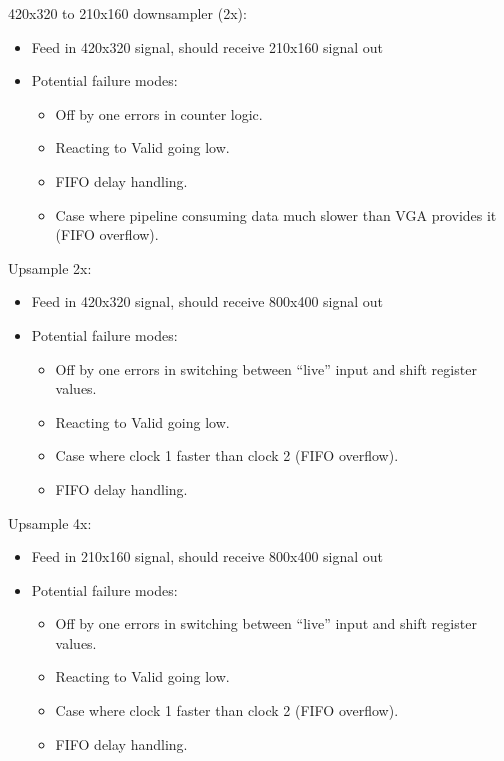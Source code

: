 \documentclass[11pt]{article}
\begin{document}
\noindent 420x320 to 210x160 downsampler (2x):
\begin{itemize}
    \item Feed in 420x320 signal, should receive 210x160 signal out
    \item Potential failure modes:
        \begin{itemize}
            \item Off by one errors in counter logic.
            \item Reacting to Valid going low.
            \item FIFO delay handling.
            \item Case where pipeline consuming data much slower than VGA provides it (FIFO overflow).
        \end{itemize}
\end{itemize}


\noindent Upsample 2x:
\begin{itemize}
    \item Feed in 420x320 signal, should receive 800x400 signal out
    \item Potential failure modes:
        \begin{itemize}
            \item Off by one errors in switching between ``live'' input and shift register values.
            \item Reacting to Valid going low.
            \item Case where clock 1 faster than clock 2 (FIFO overflow).
            \item FIFO delay handling.
        \end{itemize}
\end{itemize}


\noindent Upsample 4x:
\begin{itemize}
    \item Feed in 210x160 signal, should receive 800x400 signal out
    \item Potential failure modes:
        \begin{itemize}
            \item Off by one errors in switching between ``live'' input and shift register values.
            \item Reacting to Valid going low.
            \item Case where clock 1 faster than clock 2 (FIFO overflow).
            \item FIFO delay handling.
        \end{itemize}
\end{itemize}
\end{document}
